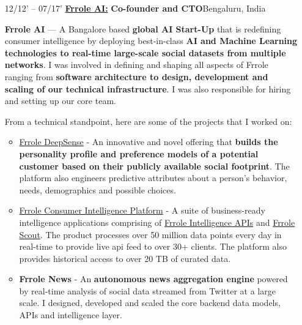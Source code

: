 \documentclass{article}
\begin{document}
\begin{itemize}[leftmargin=-1ex]
\begin{itemize}
	\end{itemize}\vspace{5pt}
	
  \item[12/12' – 07/17'] \href{https://frrole.ai/}{\textbf{Frrole AI:}} \textbf{Co-founder and CTO}\hfill Bengaluru, India
  \item[]  \textbf{Frrole AI} --- A Bangalore based \textbf{global AI Start-Up} that is redefining consumer intelligence by deploying best-in-class \textbf{AI and Machine Learning technologies to real-time large-scale social datasets from multiple networks}. I was involved in defining and shaping all aspects of Frrole ranging from \textbf{software architecture to design, development and scaling of our technical infrastructure}. I was also responsible for hiring and setting up our core team. 
  
From a technical standpoint, here are some of the projects that I worked on:  \vspace{5pt}
  
  	\begin{itemize} \setlength\itemsep{0.5em}
    
    \item \href{https://frrole.ai/deepsense}{Frrole DeepSense} - An innovative and novel offering that \textbf{builds the personality profile and preference models of a potential customer based on their publicly available social footprint}. The platform also engineers predictive attributes about a person's behavior, needs, demographics and possible choices.
  
 	\item \href{https://frrole.ai/platform}{Frrole Consumer Intelligence Platform} - A suite of business-ready intelligence applications comprising of \href{http://api.frrole.com/}{Frrole Intelligence APIs} and \href{https://frrole.ai/scout}{Frrole Scout}. The product processes over 50 million data points every day in real-time to provide live api feed to over 30+ clients. The platform also provides historical access to over 20 TB of curated data. 
  
  	\item \textbf{Frrole News} - An \textbf{autonomous news aggregation engine} powered by real-time analysis of social data streamed from Twitter at a large scale. I designed, developed and scaled the core backend data models, APIs and intelligence layer. 
  	
	\end{itemize}
     

\end{itemize}
\end{document}
